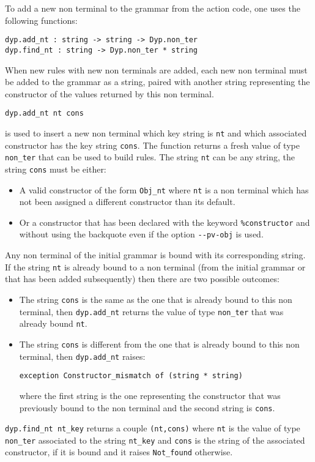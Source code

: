 \documentclass[12pt]{article}
\begin{document}
{To add a new non terminal to the grammar from the action code, one uses the following functions:
\begin{verbatim}
dyp.add_nt : string -> string -> Dyp.non_ter
dyp.find_nt : string -> Dyp.non_ter * string
\end{verbatim}
When new rules with new non terminals are added, each new non terminal must be added to the grammar as a string, paired with another string representing the constructor of the values returned by this non terminal.
\begin{verbatim}
dyp.add_nt nt cons
\end{verbatim}
is used to insert a new non terminal which key string is \verb|nt| and which associated constructor has the key string \verb|cons|. The function returns a fresh value of type \verb|non_ter| that can be used to build rules. The string \verb|nt| can be any string, the string \verb|cons| must be either:
\begin{itemize}
\item A valid constructor of the form \verb|Obj_nt| where \verb|nt| is a non terminal which has not been assigned a different constructor than its default.
\item Or a constructor that has been declared with the keyword \verb|%constructor| and without using the backquote even if the option \verb|--pv-obj| is used.
\end{itemize}
Any non terminal of the initial grammar is bound with its corresponding string. If the string \verb|nt| is already bound to a non terminal (from the initial grammar or that has been added subsequently) then there are two possible outcomes:
\begin{itemize}
\item The string \verb|cons| is the same as the one that is already bound to this non terminal, then \verb|dyp.add_nt| returns the value of type \verb|non_ter| that was already bound \verb|nt|.
\item The string \verb|cons| is different from the one that is already bound to this non terminal, then \verb|dyp.add_nt| raises:
\begin{verbatim}
exception Constructor_mismatch of (string * string)
\end{verbatim}
where the first string is the one representing the constructor that was previously bound to the non terminal and the second string is \verb|cons|.\\
\end{itemize}

\verb|dyp.find_nt nt_key| returns a couple \verb|(nt,cons)| where \verb|nt| is the value of type \verb|non_ter| associated to the string \verb|nt_key| and \verb|cons| is the string of the associated constructor, if it is bound and it raises \verb|Not_found| otherwise.\\

}
\end{document}
